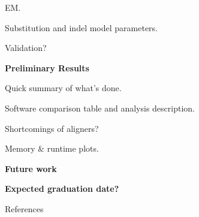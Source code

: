 \begin{outline}
\begin{outline}
		\item EM.
		\item Substitution and indel model parameters.
		\item Validation?
	\end{outline}
	\item \textbf{Preliminary Results}
	\begin{outline}
		\item Quick summary of what's done.
		\item Software comparison table and analysis description.
		\item Shortcomings of aligners?
		\item Memory \& runtime plots.
	\end{outline}
	\item \textbf{Future work}
	\item \textbf{Expected graduation date?}
	\item References
\end{outline}

